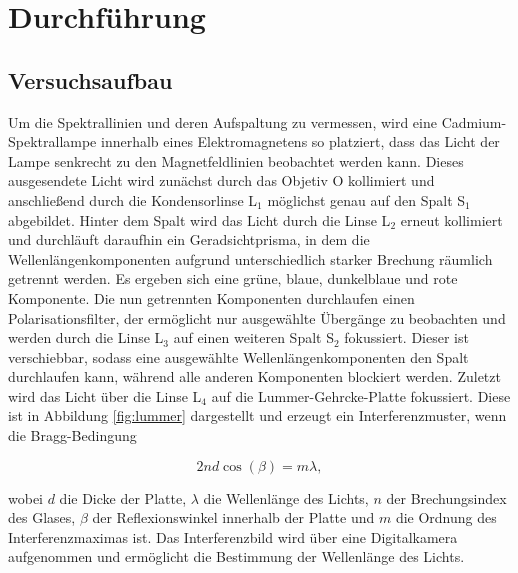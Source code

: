 \newpage
\section{Durchführung}
    \subsection{Versuchsaufbau}
        Um die Spektrallinien und deren Aufspaltung zu vermessen, wird eine Cadmium-Spektrallampe innerhalb eines Elektromagnetens so platziert, dass das Licht der Lampe senkrecht zu den Magnetfeldlinien 
        beobachtet werden kann. Dieses ausgesendete Licht wird zunächst durch das Objetiv O kollimiert und anschließend durch die Kondensorlinse L$_1$ möglichst genau auf den Spalt S$_1$ abgebildet. Hinter 
        dem Spalt wird das Licht durch die Linse L$_2$ erneut kollimiert und durchläuft daraufhin ein Geradsichtprisma, in dem die Wellenlängenkomponenten aufgrund unterschiedlich starker Brechung räumlich 
        getrennt werden. Es ergeben sich eine grüne, blaue, dunkelblaue und rote Komponente. Die nun getrennten Komponenten durchlaufen einen Polarisationsfilter, der ermöglicht nur ausgewählte Übergänge zu 
        beobachten und werden durch die Linse L$_3$ auf einen weiteren Spalt S$_2$ fokussiert. Dieser ist verschiebbar, sodass eine ausgewählte Wellenlängenkomponenten den Spalt durchlaufen kann, während alle 
        anderen Komponenten blockiert werden. Zuletzt wird das Licht über die Linse L$_4$ auf die Lummer-Gehrcke-Platte fokussiert. Diese ist in Abbildung \ref{fig:lummer} dargestellt und erzeugt ein 
        Interferenzmuster, wenn die Bragg-Bedingung

        \begin{equation*}
            2nd\cos(\beta) = m\lambda,
        \end{equation*}

        wobei $d$ die Dicke der Platte, $\lambda$ die Wellenlänge des Lichts, $n$ der Brechungsindex des Glases, $\beta$ der Reflexionswinkel innerhalb der Platte und $m$ die Ordnung des Interferenzmaximas ist.
        Das Interferenzbild wird über eine Digitalkamera aufgenommen und ermöglicht die Bestimmung der Wellenlänge des Lichts.
